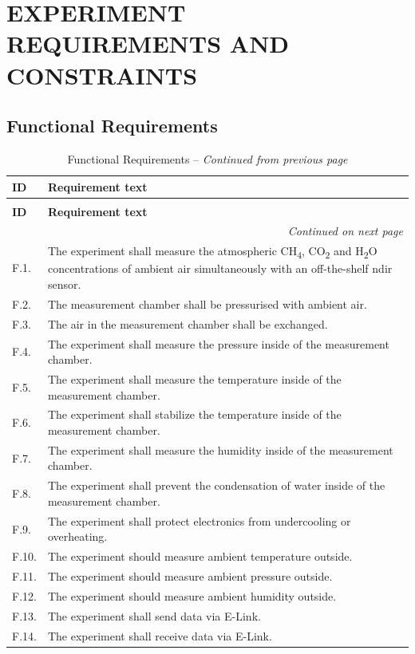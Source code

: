\chapter{EXPERIMENT REQUIREMENTS AND CONSTRAINTS}
\label{sec:requirements}
\section{Functional Requirements}

\begin{longtable}{|p{2cm}|p{12cm}|}
\caption{Functional Requirements \label{tab:functional_req}} \\
\hline
\textbf{ID} & \textbf{Requirement text} \\
\hline
\endfirsthead
\caption[]{Functional Requirements -- \textit{Continued from previous page}} \\
\hline
\textbf{ID} & \textbf{Requirement text} \\
\hline
\endhead
\hline
\multicolumn{2}{r}{\textit{Continued on next page}} \\
\endfoot
\hline
\endlastfoot
F.1. & The experiment shall measure the atmospheric CH\textsubscript{4}, CO\textsubscript{2} and H\textsubscript{2}O concentrations of ambient air simultaneously with an off-the-shelf \gls{ndir} sensor. \\
\hline
F.2. & The measurement chamber shall be pressurised with ambient air. \\
\hline
F.3. & The air in the measurement chamber shall be exchanged. \\
\hline
F.4. & The experiment shall measure the pressure inside of the measurement chamber. \\
\hline
F.5. & The experiment shall measure the temperature inside of the measurement chamber. \\
\hline
F.6. & The experiment shall stabilize the temperature inside of the measurement chamber. \\
\hline
F.7. & The experiment shall measure the humidity inside of the measurement chamber. \\
\hline
F.8. & The experiment shall prevent the condensation of water inside of the measurement chamber. \\
\hline
F.9. & The experiment shall protect electronics from undercooling or overheating. \\
\hline
F.10. & The experiment should measure ambient temperature outside. \\
\hline
F.11. & The experiment should measure ambient pressure outside. \\
\hline
F.12. & The experiment should measure ambient humidity outside. \\
\hline
F.13. & The experiment shall send data via E-Link. \\
\hline
F.14. & The experiment shall receive data via E-Link. \\
\end{longtable}

